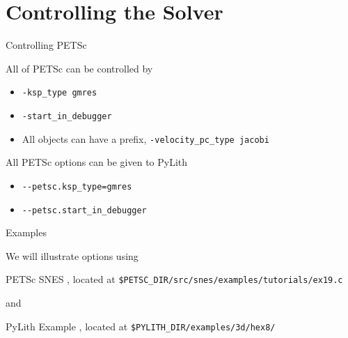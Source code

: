 \documentclass[dvipsnames]{beamer}
\begin{document}
\section{Controlling the Solver}
%
\begin{frame}[fragile]{Controlling PETSc}
\begin{center}\LARGE
  All of PETSc can be controlled by 
\end{center}
\begin{itemize}
  \item[] \verb|-ksp_type gmres|
  \item[] \verb|-start_in_debugger|
  \item[] All objects can have a prefix, \verb|-velocity_pc_type jacobi|
\end{itemize}
\pause
\medskip
\begin{center}\LARGE
  All PETSc options can be given to PyLith
\end{center}
\begin{itemize}
  \item[] \verb|--petsc.ksp_type=gmres|
  \item[] \verb|--petsc.start_in_debugger|
\end{itemize}
\end{frame}
%
\begin{frame}[fragile]{Examples}

{\LARGE We will illustrate options using}
\bigskip
\begin{center}
  PETSc SNES , located at \verb|$PETSC_DIR/src/snes/examples/tutorials/ex19.c|
\end{center}
\bigskip
{\LARGE and}
\bigskip
\begin{center}
  PyLith Example , located at \verb|$PYLITH_DIR/examples/3d/hex8/|
\end{center}
\end{frame}
%
\end{document}
